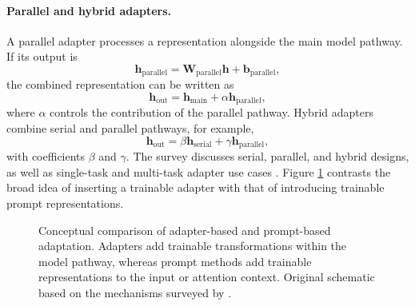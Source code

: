 \paragraph{Parallel and hybrid adapters.}
A parallel adapter processes a representation alongside the main model
pathway. If its output is
\begin{equation}
    \mathbf{h}_{\mathrm{parallel}}
    =
    \mathbf{W}_{\mathrm{parallel}}\mathbf{h}
    +\mathbf{b}_{\mathrm{parallel}},
    \label{eq:peft-parallel-adapter}
\end{equation}
the combined representation can be written as
\begin{equation}
    \mathbf{h}_{\mathrm{out}}
    =
    \mathbf{h}_{\mathrm{main}}
    +\alpha\mathbf{h}_{\mathrm{parallel}},
    \label{eq:peft-parallel-combine}
\end{equation}
where $\alpha$ controls the contribution of the parallel pathway. Hybrid
adapters combine serial and parallel pathways, for example,
\begin{equation}
    \mathbf{h}_{\mathrm{out}}
    =
    \beta\mathbf{h}_{\mathrm{serial}}
    +\gamma\mathbf{h}_{\mathrm{parallel}},
    \label{eq:peft-hybrid-adapter}
\end{equation}
with coefficients $\beta$ and $\gamma$. The survey discusses serial,
parallel, and hybrid designs, as well as single-task and multi-task adapter
use cases \parencite{prottasha2025peft}. Figure \ref{fig:peft-adapter-prompt}
contrasts the broad idea of inserting a trainable adapter with that of
introducing trainable prompt representations.

\begin{figure}[htbp]
    \centering
    
    \caption{Conceptual comparison of adapter-based and prompt-based
    adaptation. Adapters add trainable transformations within the model
    pathway, whereas prompt methods add trainable representations to the
    input or attention context. Original schematic based on the mechanisms
    surveyed by \textcite{prottasha2025peft}.}
    \label{fig:peft-adapter-prompt}
\end{figure}

